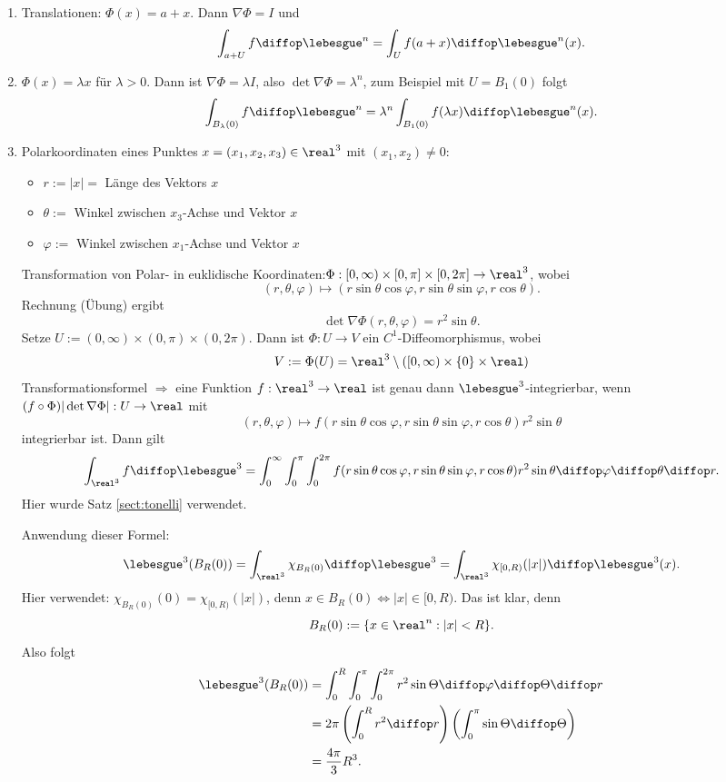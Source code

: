\begin{exmp}
 \begin{enumerate}
  \item Translationen: $\Phi(x) = a + x$. Dann $\nabla \Phi = I$ und 
  \[ \int_{a+U} f \diffop \lebesgue^n = \int_U f(a+x) \diffop \lebesgue^n(x). \]
  \item $\Phi(x) = \lambda x$ für $\lambda > 0$. Dann ist $\nabla \Phi = \lambda I$, also $\det \nabla \Phi = \lambda^n$, zum Beispiel mit $U = B_1(0)$ folgt
  \[ \int_{B_\lambda(0)} f \diffop \lebesgue^n = \lambda^n \int_{B_1(0)} f(\lambda x) \diffop \lebesgue^n(x). \]
  \item Polarkoordinaten eines Punktes $x=(x_1,x_2,x_3) \in \real^3$ mit $(x_1,x_2) \ne 0$:
   \begin{itemize}
    \item $r := |x| =$ Länge des Vektors $x$
    \item $\theta :=$ Winkel zwischen $x_3$-Achse und Vektor $x$
    \item $\varphi :=$ Winkel zwischen $x_1$-Achse und Vektor $x$
   \end{itemize}
   Transformation von Polar- in euklidische Koordinaten:$\Phi: [0, \infty) \times [0,\pi] \times [0,2\pi] \to \real^3$, wobei
   \[ (r,\theta, \varphi) \mapsto ( r \sin \theta \cos \varphi, r \sin \theta \sin \varphi, r \cos \theta ). \]
   Rechnung (Übung) ergibt
   \[ \det \nabla \Phi( r, \theta, \varphi) = r^2 \sin \theta. \]
   Setze $U := (0, \infty) \times (0,\pi) \times (0,2\pi)$. Dann ist $\Phi: U \to V$ ein $C^1$-Diffeomorphismus, wobei
   \[ V := \Phi(U) = \real^3 \setminus ( [0,\infty) \times \{ 0 \} \times \real ) \]
   Transformationsformel $\Rightarrow$ eine Funktion $f: \real^3 \to \real$ ist genau dann $\lebesgue^3$-integrierbar, wenn $(f \circ \Phi) | \det \nabla \Phi| : U \to \real$ mit
   \[ (r, \theta, \varphi) \mapsto f( r \sin \theta \cos \varphi, r \sin \theta \sin \varphi, r \cos \theta ) r^2 \sin \theta \]
   integrierbar ist. Dann gilt
   \[ \int_{\real^3} f \diffop \lebesgue^3 = \int_0^\infty \int_0^\pi \int_0^{2 \pi} f( r \sin \theta \cos \varphi, r \sin \theta \sin \varphi, r \cos \theta ) r^2 \sin \theta \diffop \varphi \diffop \theta \diffop r. \]
   Hier wurde Satz \ref{sect:tonelli} verwendet.
   
   Anwendung dieser Formel: 
   \[ \lebesgue^3( B_R(0) ) = \int_{\real^3} \chi_{B_R(0)} \diffop \lebesgue^3 = \int_{\real^3} \chi_{[0,R)}(|x|) \diffop \lebesgue^3 (x). \]
   Hier verwendet: $\chi_{B_R(0)}(0) = \chi_{[0,R)}(|x|)$, denn $x \in B_R(0) \Leftrightarrow |x| \in [0,R)$. Das ist klar, denn
   \[ B_R(0) := \{ x \in \real^n : |x| < R \}. \]
   Also folgt
   \[ \begin{aligned}       
      \lebesgue^3( B_R(0) ) 
      &= \int_0^R \int_0^\pi \int_0^{2 \pi} r^2 \sin \Theta \diffop \varphi \diffop \Theta \diffop r \\
      &= 2 \pi \left( \int_0^R r^2 \diffop r \right) \left( \int_0^\pi \sin \Theta \diffop \Theta \right) \\
      &= \frac{4 \pi}{3} R^3.
      \end{aligned} \]
 \end{enumerate}
\end{exmp}

